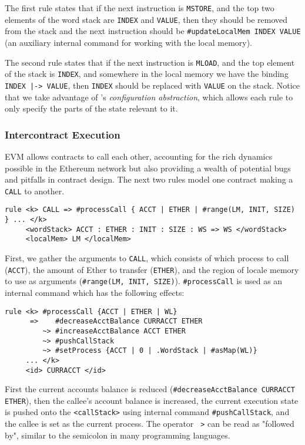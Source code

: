 The first rule states that if the next instruction is \texttt{MSTORE}, and the
top two elements of the word stack are \texttt{INDEX} and \texttt{VALUE}, then
they should be removed from the stack and the next instruction should be
\texttt{\#updateLocalMem INDEX VALUE} (an auxiliary internal command for working
with the local memory).

The second rule states that if the next instruction is \texttt{MLOAD}, and the
top element of the stack is \texttt{INDEX}, and somewhere in the local memory we
have the binding \texttt{INDEX |-> VALUE}, then \texttt{INDEX} should be
replaced with \texttt{VALUE} on the stack. Notice that we take advantage of \K's
\textit{configuration abstraction}, which allows each rule to only specify the
parts of the state relevant to it.

\subsubsection{Intercontract Execution}

EVM allows contracts to call each other, accounting for the rich dynamics
possible in the Ethereum network but also providing a wealth of potential bugs
and pitfalls in contract design. The next two rules model one contract making a
\texttt{CALL} to another.

\begin{verbatim}
rule <k> CALL => #processCall { ACCT | ETHER | #range(LM, INIT, SIZE) } ... </k>
     <wordStack> ACCT : ETHER : INIT : SIZE : WS => WS </wordStack>
     <localMem> LM </localMem>
\end{verbatim}

First, we gather the arguments to \texttt{CALL}, which consists of which process
to call (\texttt{ACCT}), the amount of Ether to transfer (\texttt{ETHER}), and
the region of locale memory to use as arguments (\texttt{\#range(LM, INIT,
SIZE)}). \texttt{\#processCall} is used as an internal command which has the
following effects:

\begin{verbatim}
rule <k> #processCall {ACCT | ETHER | WL}
      =>    #decreaseAcctBalance CURRACCT ETHER
         ~> #increaseAcctBalance ACCT ETHER
         ~> #pushCallStack
         ~> #setProcess {ACCT | 0 | .WordStack | #asMap(WL)}
     ... </k>
     <id> CURRACCT </id>
\end{verbatim}

First the current accounts balance is reduced (\texttt{\#decreaseAcctBalance
CURRACCT ETHER}), then the callee's account balance is increased, the current
execution state is pushed onto the \texttt{<callStack>} using internal command
\texttt{\#pushCallStack}, and the callee is set as the current process. The
operator \texttt{~>} can be read as "followed by", similar to the semicolon in
many programming languages.



